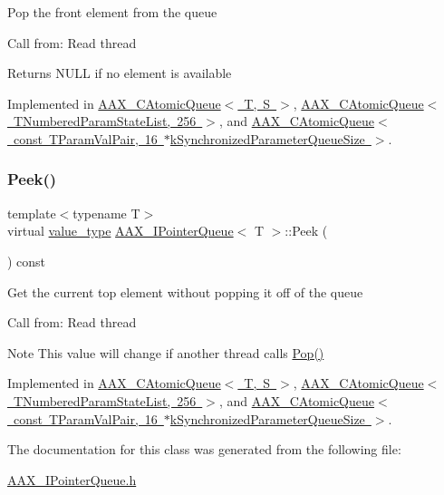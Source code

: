 Pop the front element from the queue

Call from\+: Read thread

\begin{DoxyReturn}{Returns}
{\ttfamily N\+U\+LL} if no element is available 
\end{DoxyReturn}


Implemented in \mbox{\hyperlink{a01441_a0c64180813c16b4952761f82e32d7edd}{A\+A\+X\+\_\+\+C\+Atomic\+Queue$<$ T, S $>$}}, \mbox{\hyperlink{a01441_a0c64180813c16b4952761f82e32d7edd}{A\+A\+X\+\_\+\+C\+Atomic\+Queue$<$ T\+Numbered\+Param\+State\+List, 256 $>$}}, and \mbox{\hyperlink{a01441_a0c64180813c16b4952761f82e32d7edd}{A\+A\+X\+\_\+\+C\+Atomic\+Queue$<$ const T\+Param\+Val\+Pair, 16 $\ast$k\+Synchronized\+Parameter\+Queue\+Size $>$}}.

\mbox{\label{a01861_a005cd2626fb8db4d5d708f255b48a0be}} 
\subsubsection{\texorpdfstring{Peek()}{Peek()}}
{\footnotesize\ttfamily template$<$typename T$>$ \\
virtual \mbox{\hyperlink{a01861_a2d28a2dffe8dc2b7fe218c41b46734e9}{value\+\_\+type}} \mbox{\hyperlink{a01861}{A\+A\+X\+\_\+\+I\+Pointer\+Queue}}$<$ T $>$\+::Peek (\begin{DoxyParamCaption}{ }\end{DoxyParamCaption}) const\hspace{0.3cm}{\ttfamily [pure virtual]}}

Get the current top element without popping it off of the queue

Call from\+: Read thread

\begin{DoxyNote}{Note}
This value will change if another thread calls \mbox{\hyperlink{a01861_a49990f21819f0f4493183ea0770d4125}{Pop()}} 
\end{DoxyNote}


Implemented in \mbox{\hyperlink{a01441_a0b732544b0bcdd59acfca7fac5dca984}{A\+A\+X\+\_\+\+C\+Atomic\+Queue$<$ T, S $>$}}, \mbox{\hyperlink{a01441_a0b732544b0bcdd59acfca7fac5dca984}{A\+A\+X\+\_\+\+C\+Atomic\+Queue$<$ T\+Numbered\+Param\+State\+List, 256 $>$}}, and \mbox{\hyperlink{a01441_a0b732544b0bcdd59acfca7fac5dca984}{A\+A\+X\+\_\+\+C\+Atomic\+Queue$<$ const T\+Param\+Val\+Pair, 16 $\ast$k\+Synchronized\+Parameter\+Queue\+Size $>$}}.



The documentation for this class was generated from the following file\+:\begin{DoxyCompactItemize}
\item 
\mbox{\hyperlink{a00626}{A\+A\+X\+\_\+\+I\+Pointer\+Queue.\+h}}\end{DoxyCompactItemize}
